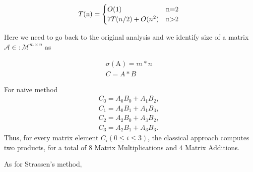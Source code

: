 \documentclass[journal]{IEEEtran}
\begin{document}
\begin{align}
  T(\mathrm{n})=
  \begin{cases}
    O(1)& \text{n=2}\\
    7T(n/2)+O(n^2)& \text{n\textgreater 2}
    \end{cases}
\end{align}


Here we need to go back to the original analysis and we identify size of a matrix $\mathcal{A}\in :\mathcal{M}^{m\times n}$ as

\begin{align}
  \sigma(\mathrm{A})= m* n \\
  C=A*B
\end{align}

For naive method
\begin{align}
  C_0 = A_0B_0 + A_1B_2,\\
  C_1 = A_0B_1 + A_1B_3,\\
  C_2 =A_2B_0 + A_3B_2,\\
  C_3 = A_2B_1 + A_3B_3.
\end{align} 
Thus, for every matrix element $C_i(0\leq i\leq 3)$, the classical approach computes two products, for a total of 8 Matrix Multiplications and 4 Matrix Additions.


As for Strassen’s method,
\end{document}
